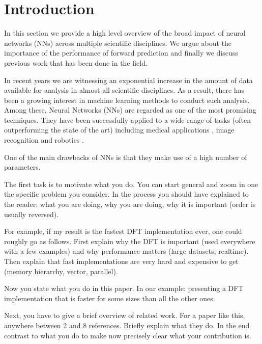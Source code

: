 
\section{Introduction}\label{sec:intro}
In this section we provide a high level overview of the broad impact of neural networks (NNs) across multiple scientific disciplines. We argue about the importance of the performance of forward prediction and finally we discuss previous work that has been done in the field.

 In recent years we are witnessing an exponential increase in the amount of data available for analysis in almost all scientific disciplines. As a result, there has been a growing interest in machine learning methods to conduct such analysis. Among these, Neural Networks (NNs) are regarded as one of the most promising techniques. 
They have been successfully applied to a wide range of tasks (often outperforming the state of the art) including medical applications \cite{amato_artificial_2013}, image recognition \cite{krizhevsky_imagenet_2012} and robotics \cite{gu_deep_2016}. 

One of the main drawbacks of NNs is that they make use of a high number of parameters. 

 The first task is to motivate what you do.  You can
start general and zoom in one the specific problem you consider.  In
the process you should have explained to the reader: what you are doing,
why you are doing, why it is important (order is usually reversed).

For example, if my result is the fastest DFT implementation ever, one
could roughly go as follows. First explain why the DFT is important
(used everywhere with a few examples) and why performance matters (large datasets,
realtime). Then explain that fast implementations are very hard and
expensive to get (memory hierarchy, vector, parallel). 

Now you state what you do in this paper. In our example: 
presenting a DFT implementation that is
faster for some sizes than all the other ones.

 Next, you have to give a brief overview of
related work. For a paper like this, anywhere between 2 and 8
references. Briefly explain what they do. In the end contrast to what
you do to make now precisely clear what your contribution is.
